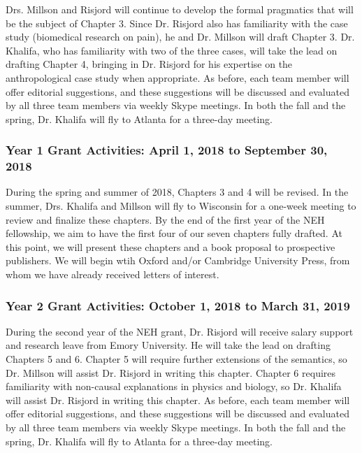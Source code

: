\documentclass{article}[11pt]
\begin{document}
Drs. Millson and Risjord will continue to develop the formal pragmatics that will be the subject of Chapter 3. Since Dr. Risjord also has familiarity with the case study (biomedical research on pain), he and Dr. Millson will draft Chapter 3. Dr. Khalifa, who has familiarity with two of the three cases, will take the lead on drafting Chapter 4, bringing in Dr. Risjord for his expertise on the anthropological case study when appropriate. As before, each team member will offer editorial suggestions, and these suggestions will be discussed and evaluated by all three team members via weekly Skype meetings. In both the fall and the spring, Dr. Khalifa will fly to Atlanta for a three-day meeting. 

\subsubsection*{Year 1 Grant Activities: April 1, 2018 to September 30, 2018}

During the spring and summer of 2018, Chapters 3 and 4 will be revised.  In the summer, Drs. Khalifa and Millson will fly to Wisconsin for a one-week meeting to review and finalize these chapters. By the end of the first year of the NEH fellowship, we aim to have the first four of our seven chapters fully drafted. At this point, we will present these chapters and a book proposal to prospective publishers. We will begin wtih Oxford and/or Cambridge University Press, from whom we have already received letters of interest. 


\subsubsection*{Year 2 Grant Activities: October 1, 2018 to March 31, 2019}

During the second year of the NEH grant, Dr. Risjord will receive salary support and research leave from Emory University.  He will take the lead on drafting Chapters 5 and 6. Chapter 5 will require further extensions of the semantics, so Dr. Millson will assist Dr. Risjord in writing this chapter. Chapter 6 requires familiarity with non-causal explanations in physics and biology, so Dr. Khalifa will assist Dr. Risjord in writing this chapter. As before, each team member will offer editorial suggestions, and these suggestions will be discussed and evaluated by all three team members via weekly Skype meetings. In both the fall and the spring, Dr. Khalifa will fly to Atlanta for a three-day meeting. 
\end{document}
